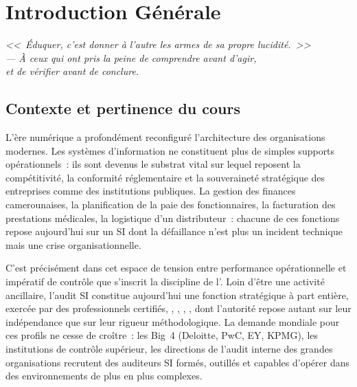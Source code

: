 
\chapter*{Introduction Générale}
\label{chap:introduction}

\begin{flushright}
    \itshape
    <<~Éduquer, c'est donner à l'autre les armes de sa propre lucidité.~>>\\[0.8ex]
    \small--- À ceux qui ont pris la peine de comprendre avant d'agir,\\
    et de vérifier avant de conclure.
\end{flushright}

\vspace{1.5ex}

\section*{Contexte et pertinence du cours}

L'ère numérique a profondément reconfiguré l'architecture des organisations modernes. Les systèmes d'information ne constituent plus de simples supports opérationnels~: ils sont devenus le substrat vital sur lequel reposent la compétitivité, la conformité réglementaire et la souveraineté stratégique des entreprises comme des institutions publiques. La gestion des finances camerounaises, la planification de la paie des fonctionnaires, la facturation des prestations médicales, la logistique d'un distributeur~: chacune de ces fonctions repose aujourd'hui sur un SI dont la défaillance n'est plus un incident technique mais une crise organisationnelle.

C'est précisément dans cet espace de tension entre performance opérationnelle et impératif de contrôle que s'inscrit la discipline de l'. Loin d'être une activité ancillaire, l'audit SI constitue aujourd'hui une fonction stratégique à part entière, exercée par des professionnels certifiés, , , , , dont l'autorité repose autant sur leur indépendance que sur leur rigueur méthodologique. La demande mondiale pour ces profils ne cesse de croître~: les Big~4 (Deloitte, PwC, EY, KPMG), les institutions de contrôle supérieur, les directions de l'audit interne des grandes organisations recrutent des auditeurs SI formés, outillés et capables d'opérer dans des environnements de plus en plus complexes.

